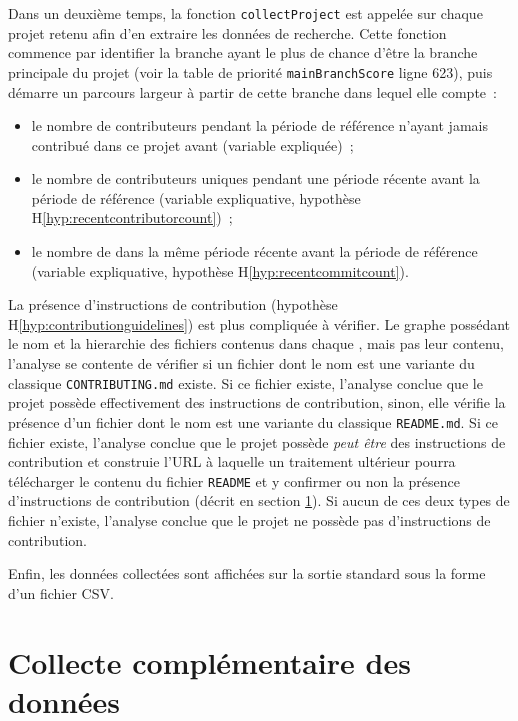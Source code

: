 Dans un deuxième temps, la fonction \texttt{collectProject} est appelée sur chaque projet retenu afin d'en
extraire les données de recherche. Cette fonction commence par identifier la branche ayant le plus de chance
d'être la branche principale du projet (voir la table de priorité \texttt{mainBranchScore} ligne 623), puis
démarre un parcours largeur à partir de cette branche dans lequel elle compte :

\begin{itemize}
    \item le nombre de contributeurs pendant la période de référence n'ayant jamais contribué dans ce projet
        avant (variable expliquée) ;
    \item le nombre de contributeurs uniques pendant une période récente avant la période de référence
        (variable expliquative, hypothèse H\ref{hyp:recentcontributorcount}) ;
    \item le nombre de  dans la même période récente avant la période de référence (variable
        expliquative, hypothèse H\ref{hyp:recentcommitcount}).
\end{itemize}

La présence d'instructions de contribution (hypothèse H\ref{hyp:contributionguidelines}) est plus compliquée à
vérifier. Le graphe possédant le nom et la hierarchie des fichiers contenus dans chaque , mais
pas leur contenu, l'analyse se contente de vérifier si un fichier dont le nom est une variante du classique
\texttt{CONTRIBUTING.md} existe. Si ce fichier existe, l'analyse conclue que le projet possède effectivement
des instructions de contribution, sinon, elle vérifie la présence d'un fichier dont le nom est une variante du
classique \texttt{README.md}. Si ce fichier existe, l'analyse conclue que le projet possède \emph{peut être}
des instructions de contribution et construie l'URL à laquelle un traitement ultérieur pourra télécharger le
contenu du fichier \texttt{README} et y confirmer ou non la présence d'instructions de contribution (décrit en
section \ref{sec:collectreadme}). Si aucun de ces deux types de fichier n'existe, l'analyse conclue que le
projet ne possède pas d'instructions de contribution.

Enfin, les données collectées sont affichées sur la sortie standard sous la forme d'un fichier CSV.

\section{Collecte complémentaire des données}
\label{sec:collectreadme}

